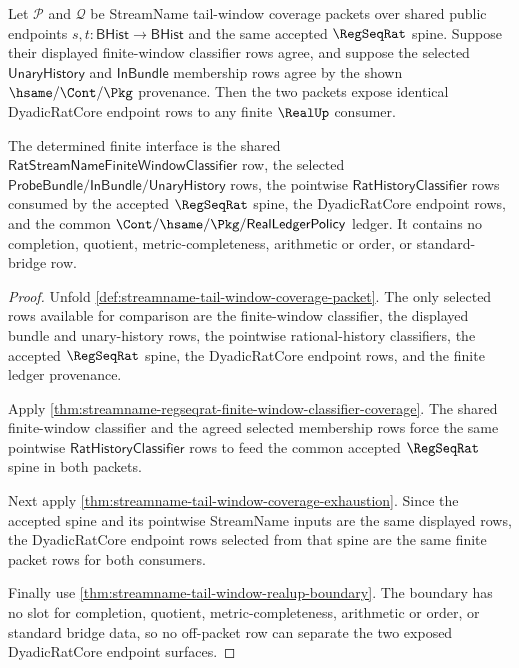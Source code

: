 \begin{theorem}
\label{thm:streamname-tail-window-dyadic-endpoint-determinacy}
Let $\mathcal P$ and $\mathcal Q$ be StreamName tail-window coverage packets
over shared public endpoints $s,t:\mathsf{BHist}\to\mathsf{BHist}$ and the same
accepted $\RegSeqRat$ spine. Suppose their displayed finite-window classifier
rows agree, and suppose the selected $\mathsf{UnaryHistory}$ and
$\mathsf{InBundle}$ membership rows agree by the shown
$\hsame/\Cont/\Pkg$ provenance. Then the two packets expose identical
DyadicRatCore endpoint rows to any finite $\RealUp$ consumer.

The determined finite interface is the shared
$\mathsf{RatStreamNameFiniteWindowClassifier}$ row, the selected
$\mathsf{ProbeBundle}/\mathsf{InBundle}/\mathsf{UnaryHistory}$ rows, the
pointwise $\mathsf{RatHistoryClassifier}$ rows consumed by the accepted
$\RegSeqRat$ spine, the DyadicRatCore endpoint rows, and the common
$\Cont/\hsame/\Pkg/\mathsf{RealLedgerPolicy}$ ledger. It contains no completion,
quotient, metric-completeness, arithmetic or order, or standard-bridge row.
\end{theorem}
\begin{proof}
Unfold \autoref{def:streamname-tail-window-coverage-packet}. The only selected
rows available for comparison are the finite-window classifier, the displayed
bundle and unary-history rows, the pointwise rational-history classifiers, the
accepted $\RegSeqRat$ spine, the DyadicRatCore endpoint rows, and the finite
ledger provenance.

Apply \autoref{thm:streamname-regseqrat-finite-window-classifier-coverage}. The
shared finite-window classifier and the agreed selected membership rows force
the same pointwise $\mathsf{RatHistoryClassifier}$ rows to feed the common
accepted $\RegSeqRat$ spine in both packets.

Next apply \autoref{thm:streamname-tail-window-coverage-exhaustion}. Since the
accepted spine and its pointwise StreamName inputs are the same displayed rows,
the DyadicRatCore endpoint rows selected from that spine are the same finite
packet rows for both consumers.

Finally use \autoref{thm:streamname-tail-window-realup-boundary}. The boundary
has no slot for completion, quotient, metric-completeness, arithmetic or order,
or standard bridge data, so no off-packet row can separate the two exposed
DyadicRatCore endpoint surfaces.
\end{proof}

